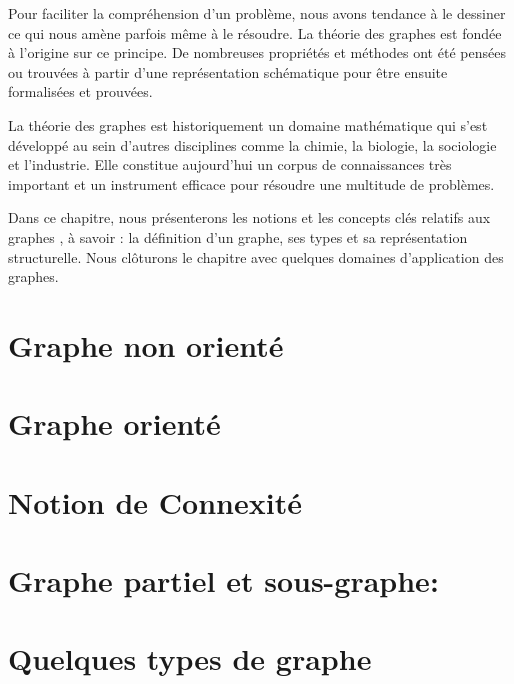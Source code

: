 Pour faciliter la compréhension d'un problème, nous avons tendance à le dessiner ce qui nous amène parfois même à le résoudre. La théorie des graphes est fondée à l'origine sur ce principe. De nombreuses propriétés et méthodes ont été pensées ou trouvées à partir d'une représentation schématique pour être ensuite formalisées et prouvées.


La théorie des graphes est historiquement un domaine mathématique qui s'est développé  au sein d'autres disciplines comme la chimie, la biologie, la sociologie et l'industrie. Elle constitue aujourd'hui un corpus de connaissances très important et un instrument efficace pour résoudre une multitude de problèmes.


Dans ce chapitre, nous présenterons les notions et les concepts clés relatifs aux graphes , à savoir : la définition d'un graphe, ses types et sa représentation structurelle. Nous clôturons le chapitre avec quelques domaines d'application des graphes.

	
	\section{Graphe non orienté}
		
			
	\section{Graphe orienté}	
		
		
	\section{Notion de Connexité}
	
	
	
	
	
	\section{Graphe partiel et sous-graphe:}
    				
	
	\section{Quelques types de graphe}
			
	
	
    		
